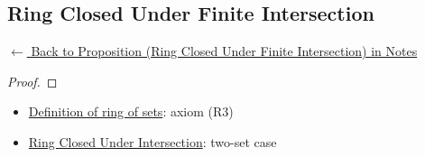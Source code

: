 
\subsection*{Ring Closed Under Finite Intersection}
\label{prf:ring-closed-finite-intersection}

\begin{remark*}[Return]
\hyperref[prop:ring-closed-finite-intersection]{$\leftarrow$ Back to Proposition (Ring Closed Under Finite Intersection) in Notes}
\end{remark*}

\begin{proof}
\end{proof}

\begin{remark*}

\end{remark*}

\begin{remark*}[Dependencies]
\begin{itemize}
  \item \hyperref[def:ring-of-sets]{Definition of ring of sets}: axiom (R3)
  \item \hyperref[prop:ring-closed-intersection]{Ring Closed Under Intersection}: two-set case
\end{itemize}

\end{remark*}
